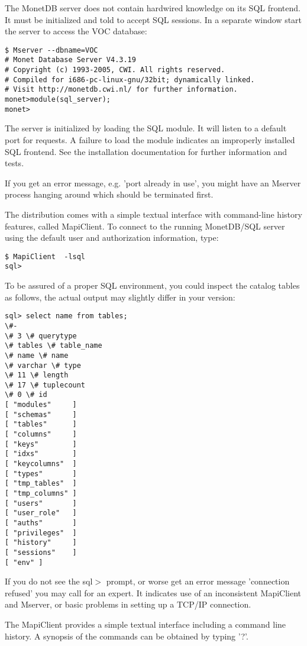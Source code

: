 \documentclass[10pt,twocolumn,fleqn]{article}
\begin{document}
The MonetDB server does not contain hardwired knowledge on its SQL frontend.
It must be initialized and told to accept SQL sessions. In a separate window
start the server to access the VOC database:

{\footnotesize
\begin{verbatim}
$ Mserver --dbname=VOC 
# Monet Database Server V4.3.19
# Copyright (c) 1993-2005, CWI. All rights reserved.
# Compiled for i686-pc-linux-gnu/32bit; dynamically linked.
# Visit http://monetdb.cwi.nl/ for further information.
monet>module(sql_server);
monet>
\end{verbatim}
}

The server is initialized by loading the SQL module. It will listen
to a default port for requests.
A failure to load the module indicates an improperly installed SQL
frontend. See the installation documentation for further information and
tests.

If you get an error message, e.g. 'port already in use', you might have 
an Mserver process hanging around which should be terminated first.

The distribution comes with a simple textual interface with
command-line history features, called MapiClient.
To connect to the running MonetDB/SQL server using the
default user and authorization information, type:

\begin{verbatim}
$ MapiClient  -lsql 
sql>
\end{verbatim}
To be assured of a proper SQL environment, you could inspect the catalog
tables as follows, the actual output may slightly differ in your version:
\begin{verbatim}
sql> select name from tables;
\#-
\# 3 \# querytype
\# tables \# table_name
\# name \# name
\# varchar \# type
\# 11 \# length
\# 17 \# tuplecount
\# 0 \# id
[ "modules"     ]
[ "schemas"     ]
[ "tables"      ]
[ "columns"     ]
[ "keys"        ]
[ "idxs"        ]
[ "keycolumns"  ]
[ "types"       ]
[ "tmp_tables"  ]
[ "tmp_columns" ]
[ "users"       ]
[ "user_role"   ]
[ "auths"       ]
[ "privileges"  ]
[ "history"     ]
[ "sessions"    ]
[ "env" ]
\end{verbatim}

If you do not see the sql$>$ prompt, or worse get an error
message 'connection refused' you may call for an expert.
It indicates use of an inconsistent MapiClient and Mserver,
or basic problems in setting up a TCP/IP connection.

The MapiClient provides a simple textual interface including
a command line history. A synopsis of the commands can be obtained
by typing '?'.
\end{document}

